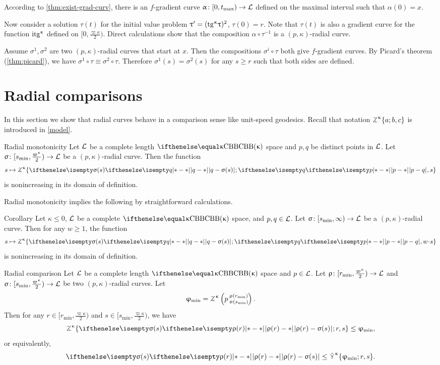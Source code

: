 According to \ref{thm:exist-grad-curv}, there is an $f$-gradient curve $\alpha\:[0,t_{\max})\to \spc{L}$ defined on the maximal interval such that $\alpha(0)=x$.

Now consider a solution $\tau(t)$ for the initial value problem $\tau'\z=(\tg\kappa\tau)^2$, $\tau(0)=r$. 
Note that $\tau(t)$ is also a gradient curve  for the function $\mathrm{itg}^{\upkappa}$ defined on $[0,\tfrac{\varpi\kappa}2)$.
Direct calculations show that the composition $\alpha\circ\tau^{-1}$ 
is a $(p,\kappa)$-radial curve.

 Assume $\sigma^1,\sigma^2$ are two $(p,\kappa)$-radial curves that start at $x$.
Then the compositions $\sigma^i\circ\tau$ both give $f$-gradient curves.
By Picard's theorem (\ref{thm:picard}), we have
$\sigma^1\circ\tau 
\equiv 
\sigma^2\circ\tau$.
Therefore $\sigma^1(s)=\sigma^2(s)$ 
for any $s\ge r$ such that both sides are defined.
\qeds

\section{Radial comparisons}\label{sec:Radial comparisons}

In this section we show that radial curves behave in a comparison sense like unit-speed geodesics.
Recall that notation $\tangle\mc\kappa\{a;b,c\}$ is introduced in \ref{model}.

\begin{thm}{Radial monotonicity}\label{rad-mon}
Let $\mathcal{L}$ be a complete length $\Alex{\kappa}$ space and
$p, q$ be distinct points in $\mathcal{L}$.
Let $\sigma\:  [s_{\min},\tfrac{\varpi\kappa}2)\to \spc{L}$
be a $(p,\kappa)$-radial curve.
Then the function 
\[s\mapsto 
\tangle\mc\kappa\{
\dist{q}{\sigma(s)}{};
\dist{p}{q}{},
s
\}\]
is nonincreasing in its domain of definition.
\end{thm}

Radial monotonicity implies the following by straightforward calculations.

\begin{thm}{Corollary}\label{cor:rad-comp}
Let $\kappa\le0$,
$\mathcal{L}$ be a complete $\Alex\kappa$ space,
and $p, q\in \spc{L}$.
Let $\sigma\:[s_{\min},\infty)\to \spc{L}$ be a $(p,\kappa)$-radial curve.
Then for any $w\ge 1$, 
the function
\[
s\mapsto \tangle\mc\kappa\{\dist{q}{\sigma(s)}{};\dist{p}{q}{},w\cdot s\}
\]
is nonincreasing in its domain of definition.
\end{thm}


\begin{thm}{Radial comparison}\label{rad-comp}
Let $\mathcal{L}$ be a complete length $\Alex{\kappa}$ space 
and $p\in \spc{L}$.
Let $\rho\:  [r_{\min},\tfrac{\varpi\kappa}2)\to \spc{L}$
and    $\sigma\:[s_{\min},\tfrac{\varpi\kappa}2)\to \spc{L}$
be two $(p,\kappa)$-radial curves.
Let
\[\phi_{\min}=\angkk\kappa p{\rho(r_{\min})}{\sigma(s_{\min})}.
\]
Then for any $r\in[r_{\min},\tfrac{\varpi\kappa}2)$ and  $s\in[s_{\min},\tfrac{\varpi\kappa}2)$,
we have
\[
\tangle\mc\kappa\{\dist{\rho(r)}{\sigma(s)}{};r,s\}
\le \phi_{\min},
\]
or equivalently,
\[
\dist{\rho(r)}{\sigma(s)}{}
\le \side\kappa\{\phi_{\min};r,s\}.
\]

\end{thm}


